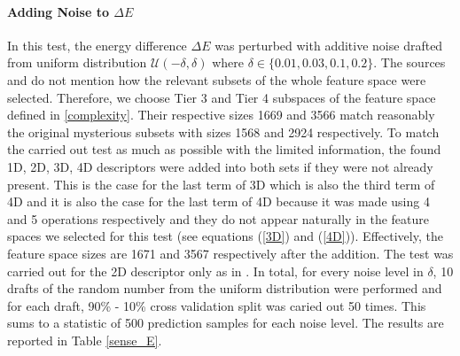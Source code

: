 \documentclass[11pt,oneside,czech,american]{book} %
\theoremstyle{definition} %
\theoremstyle{definition}
\begin{document}
\paragraph{Adding Noise to $\Delta E$}
In this test, the energy difference $\Delta E$ was perturbed with additive noise drafted from uniform distribution $\mathcal{U}(-\delta, \delta)$ where $\delta \in \{0.01, 0.03, 0.1, 0.2\}$. The sources \parencite{ghiringhelli15} and \parencite{ghiringhelli17} do not mention how the relevant subsets of the whole feature space were selected. Therefore, we choose Tier 3 and Tier 4 subspaces of the feature space defined in \ref{complexity}. Their respective sizes 1669 and 3566 match reasonably the original mysterious subsets with sizes 1568 and 2924 respectively. To match the carried out test as much as possible with the limited information, the found 1D, 2D, 3D, 4D descriptors were added into both sets if they were not already present. This is the case for the last term of 3D which is also the third term of 4D and it is also the case for the last term of 4D because it was made using 4 and 5 operations respectively and they do not appear naturally in the feature spaces we selected for this test (see equations (\ref{3D}) and (\ref{4D})). Effectively, the feature space sizes are 1671 and 3567 respectively after the addition. The test was carried out for the 2D descriptor only as in \parencite{ghiringhelli17}. In total, for every noise level in $\delta$, 10 drafts of the random number from the uniform distribution were performed and for each draft, 90\% - 10\% cross validation split was caried out 50 times. This sums to a statistic of 500 prediction samples for each noise level. The results are reported in Table \ref{sense_E}.
\end{document}
